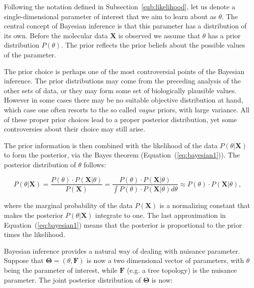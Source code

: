 Following the notation defined in Subsection~\ref{sub:likelihood}, let us denote a single-dimensional parameter of interest that we aim to learn about as $\theta$.
The central concept of Bayesian inference is that this parameter has a distribution of its own.
Before the molecular data $\mathbf{X}$ is observed we assume that $\theta$ has a prior distribution $P(\theta)$.
The prior reflects the prior beliefs about the possible values of the parameter.

The prior choice is perhaps one of the most controversial points of the Bayesian inference.
The prior distributions may come from the preceding analysis of the other sets of data, or they may form some set of biologically plausible values.
However in some cases there may be no suitable objective distribution at hand, which case one often resorts to the so called \emph{vague} priors, with large variance.
All of these proper prior choices lead to a proper posterior distribution, yet some controversies about their choice may still arise.

The prior information is then combined with the likelihood of the data $P\left(\theta|\mathbf{X}\right)$ to form the posterior, via the Bayes theorem (Equation~(\ref{eq:bayesian1})).
The posterior distribution of $\theta$ follows:

\begin{equation}
P\left(\theta|\mathbf{X}\right)=\frac{P(\theta)\cdot P\left(\mathbf{X}|\theta\right)}{P\left(\mathbf{X}\right)}=\frac{P(\theta)\cdot P\left(\mathbf{X}|\theta\right)}{\int P(\theta)\cdot P\left(\mathbf{X}|\theta\right)d\theta}\approx P(\theta)\cdot P\left(\mathbf{X}|\theta\right),
\label{eq:bayesian1}
\end{equation}

\noindent
where the marginal probability of the data $P\left(\mathbf{X}\right)$ is a normalizing constant that makes the posterior $P\left(\theta|\mathbf{X}\right)$ integrate to one.
The last approximation in Equation~(\ref{eq:bayesian1}) means that the posterior is proportional to the prior times the likelihood.

Bayesian inference provides a natural way of dealing with nuisance parameter.
Suppose that $\mathbf{\Theta}=\left(\theta,\mathbf{F}\right)$ is now a two dimensional vector of parameters, with $\theta$ being the parameter of interest, while 
$\mathbf{F}$ (e.g. a tree topology) is the nuisance parameter.
The joint posterior distribution of $\mathbf{\Theta}$ is now:

